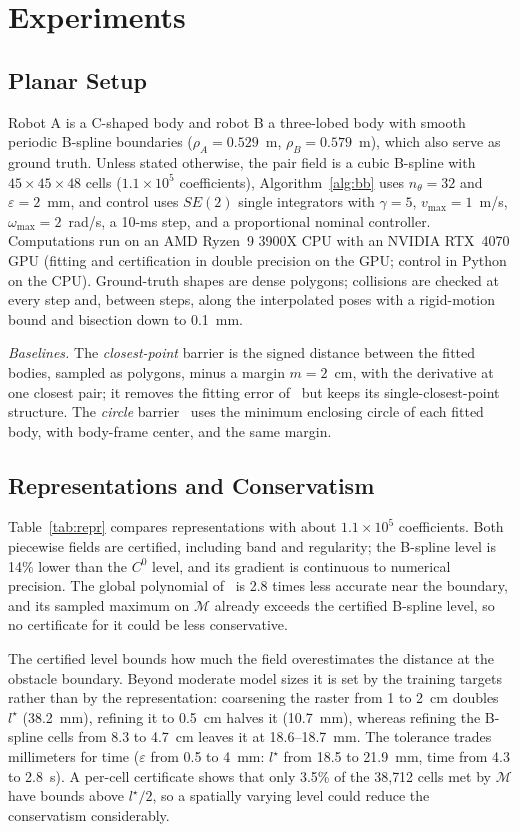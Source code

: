 \documentclass[journal]{IEEEtran}
\theoremstyle{definition}
\newcommand{\Mset}{\mathcal{M}}
\begin{document}
\section{Experiments}\label{sec:exp}

\subsection{Planar Setup}
Robot A is a C-shaped body and robot B a three-lobed body with smooth periodic B-spline boundaries
($\rho_A=0.529$~m, $\rho_B=0.579$~m), which also serve as ground truth. Unless stated otherwise, the
pair field is a cubic B-spline with $45\times45\times48$ cells ($1.1\times10^5$ coefficients),
Algorithm~\ref{alg:bb} uses $n_\theta=32$ and $\varepsilon=2$~mm, and control uses $SE(2)$ single
integrators with $\gamma=5$, $v_{\max}=1$~m/s, $\omega_{\max}=2$~rad/s, a 10-ms step, and a
proportional nominal controller. Computations run on an AMD Ryzen~9 3900X CPU with an NVIDIA
RTX~4070 GPU (fitting and certification in double precision on the GPU; control in Python on the
CPU). Ground-truth shapes are dense polygons; collisions are checked at every step and, between
steps, along the interpolated poses with a rigid-motion bound and bisection down to 0.1~mm.

\emph{Baselines.} The \emph{closest-point} barrier is the signed distance between the fitted bodies,
sampled as polygons, minus a margin $m=2$~cm, with the derivative at one closest pair; it
removes the fitting error of~\cite{jo2026geometry} but keeps its single-closest-point structure.
The \emph{circle} barrier~\cite{wang2017safety} uses the minimum enclosing circle of each fitted
body, with body-frame center, and the same margin.

\subsection{Representations and Conservatism}\label{sec:exp-repr}
Table~\ref{tab:repr} compares representations with about $1.1\times10^5$ coefficients. Both piecewise
fields are certified, including band and regularity; the B-spline level is 14\% lower than the
$C^0$ level, and its gradient is continuous to numerical precision. The global polynomial
of~\cite{jo2026geometry} is 2.8 times less accurate near the boundary, and its sampled maximum on
$\Mset$ already exceeds the certified B-spline level, so no certificate for it could be less
conservative.

The certified level bounds how much the field overestimates the distance at the obstacle boundary.
Beyond moderate model sizes it is set by the training targets rather than by the representation:
coarsening the raster from 1 to 2~cm doubles $l^\star$ (38.2~mm), refining it to 0.5~cm halves it
(10.7~mm), whereas refining the B-spline cells from 8.3 to 4.7~cm leaves it at 18.6--18.7~mm. The
tolerance trades millimeters for time ($\varepsilon$ from 0.5 to 4~mm: $l^\star$ from 18.5 to
21.9~mm, time from 4.3 to 2.8~s). A per-cell certificate shows that only 3.5\% of the 38{,}712 cells
met by $\Mset$ have bounds above $l^\star/2$, so a spatially varying level could reduce the
conservatism considerably.
\end{document}
